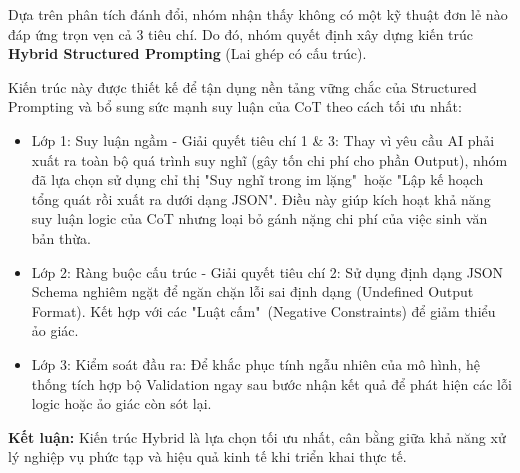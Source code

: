 
Dựa trên phân tích đánh đổi, nhóm nhận thấy không có một kỹ thuật đơn lẻ nào đáp ứng trọn vẹn cả 3 tiêu chí. Do đó, nhóm quyết định xây dựng kiến trúc \textbf{Hybrid Structured Prompting} (Lai ghép có cấu trúc).

Kiến trúc này được thiết kế để tận dụng nền tảng vững chắc của Structured Prompting và bổ sung sức mạnh suy luận của CoT theo cách tối ưu nhất:

\begin{itemize}
    \item Lớp 1: Suy luận ngầm - Giải quyết tiêu chí 1 \& 3: Thay vì yêu cầu AI phải xuất ra toàn bộ quá trình suy nghĩ (gây tốn chi phí cho phần Output), nhóm đã lựa chọn sử dụng chỉ thị "Suy nghĩ trong im lặng"\ hoặc "Lập kế hoạch tổng quát rồi xuất ra dưới dạng JSON". Điều này giúp kích hoạt khả năng suy luận logic của CoT nhưng loại bỏ gánh nặng chi phí của việc sinh văn bản thừa.
    \item Lớp 2: Ràng buộc cấu trúc - Giải quyết tiêu chí 2: Sử dụng định dạng JSON Schema nghiêm ngặt để ngăn chặn lỗi sai định dạng (Undefined Output Format). Kết hợp với các "Luật cấm"\ (Negative Constraints) để giảm thiểu ảo giác.
    \item Lớp 3: Kiểm soát đầu ra: Để khắc phục tính ngẫu nhiên của mô hình, hệ thống tích hợp bộ Validation ngay sau bước nhận kết quả để phát hiện các lỗi logic hoặc ảo giác còn sót lại.
\end{itemize}

\textbf{Kết luận:} Kiến trúc Hybrid là lựa chọn tối ưu nhất, cân bằng giữa khả năng xử lý nghiệp vụ phức tạp và hiệu quả kinh tế khi triển khai thực tế.
